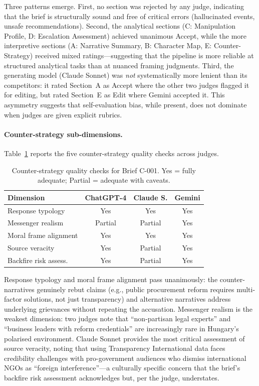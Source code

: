 \documentclass[10pt, a4paper]{article}
\begin{document}
Three patterns emerge. First, no section was rejected by any judge, indicating that the brief is structurally sound and free of critical errors (hallucinated events, unsafe recommendations). Second, the analytical sections (C: Manipulation Profile, D: Escalation Assessment) achieved unanimous Accept, while the more interpretive sections (A: Narrative Summary, B: Character Map, E: Counter-Strategy) received mixed ratings---suggesting that the pipeline is more reliable at structured analytical tasks than at nuanced framing judgments. Third, the generating model (Claude Sonnet) was \emph{not} systematically more lenient than its competitors: it rated Section~A as Accept where the other two judges flagged it for editing, but rated Section~E as Edit where Gemini accepted it. This asymmetry suggests that self-evaluation bias, while present, does not dominate when judges are given explicit rubrics.

\paragraph{Counter-strategy sub-dimensions.}
Table~\ref{tab:counter_strategy_checks} reports the five counter-strategy quality checks across judges.

\begin{table}[!ht]
\begin{center}
\small
\begin{tabular}{lccc}
  \hline
  \textbf{Dimension} & \textbf{ChatGPT-4} & \textbf{Claude S.} & \textbf{Gemini} \\
  \hline
  Response typology    & Yes       & Yes       & Yes \\
  Messenger realism    & Partial   & Partial   & Yes \\
  Moral frame alignment & Yes      & Yes       & Yes \\
  Source veracity       & Yes       & Partial   & Yes \\
  Backfire risk assess. & Yes       & Partial   & Yes \\
  \hline
\end{tabular}
\caption{Counter-strategy quality checks for Brief C-001. Yes = fully adequate; Partial = adequate with caveats.}
\label{tab:counter_strategy_checks}
\end{center}
\end{table}

Response typology and moral frame alignment pass unanimously: the counter-narratives genuinely rebut claims (e.g., public procurement reform requires multi-factor solutions, not just transparency) and alternative narratives address underlying grievances without repeating the accusation. Messenger realism is the weakest dimension: two judges note that ``non-partisan legal experts'' and ``business leaders with reform credentials'' are increasingly rare in Hungary's polarised environment. Claude Sonnet provides the most critical assessment of source veracity, noting that using Transparency International data faces credibility challenges with pro-government audiences who dismiss international NGOs as ``foreign interference''---a culturally specific concern that the brief's backfire risk assessment acknowledges but, per the judge, understates.
\end{document}
